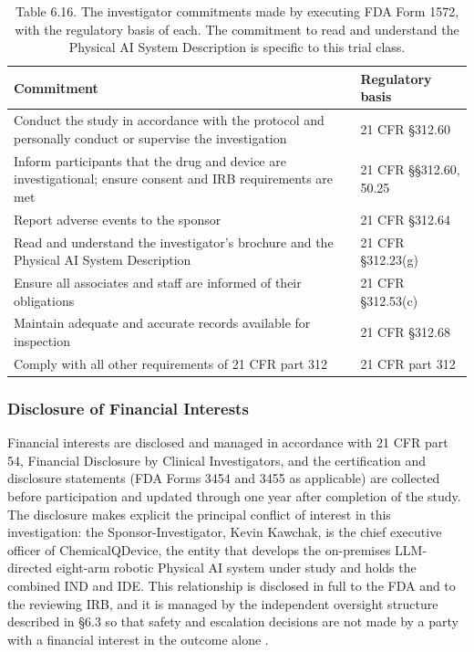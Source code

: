 \begin{table}[t]
\caption{Table 6.16. The investigator commitments made by executing FDA Form 1572,
with the regulatory basis of each. The commitment to read and understand the
Physical AI System Description is specific to this trial class.}
\label{tab:sec06-1572}
\centering
\begin{tabularx}{\textwidth}{Y L{3.4cm}}
\toprule
\textbf{Commitment} & \textbf{Regulatory basis} \\
\midrule
Conduct the study in accordance with the protocol and personally conduct or supervise the investigation & 21 CFR \S 312.60 \\
Inform participants that the drug and device are investigational; ensure consent and IRB requirements are met & 21 CFR \S\S 312.60, 50.25 \\
Report adverse events to the sponsor & 21 CFR \S 312.64 \\
Read and understand the investigator's brochure and the Physical AI System Description & 21 CFR \S 312.23(g) \\
Ensure all associates and staff are informed of their obligations & 21 CFR \S 312.53(c) \\
Maintain adequate and accurate records available for inspection & 21 CFR \S 312.68 \\
Comply with all other requirements of 21 CFR part 312 & 21 CFR part 312 \\
\bottomrule
\end{tabularx}
\end{table}

\subsubsection{Disclosure of Financial Interests}

Financial interests are disclosed and managed in accordance with 21 CFR part 54,
Financial Disclosure by Clinical Investigators, and the certification and disclosure
statements (FDA Forms 3454 and 3455 as applicable) are collected before participation
and updated through one year after completion of the study. The disclosure makes
explicit the principal conflict of interest in this investigation: the
Sponsor-Investigator, Kevin Kawchak, is the chief executive officer of
ChemicalQDevice, the entity that develops the on-premises LLM-directed eight-arm
robotic Physical AI system under study and holds the combined IND and IDE. This
relationship is disclosed in full to the FDA and to the reviewing IRB, and it is
managed by the independent oversight structure described in \S 6.3 so that safety and
escalation decisions are not made by a party with a financial interest in the outcome
alone \cite{cfr312paiuni,clintrustpai}.

